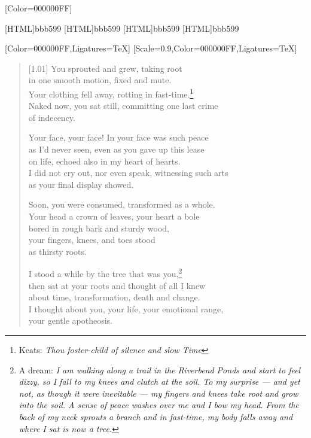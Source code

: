 \renewfontfamily{}[Color=000000FF]

[HTML]{bbb599}
[HTML]{bbb599}
[HTML]{bbb599}
[HTML]{bbb599}
\begin{paracol}{2}
  \begin{leftcolumn}
[Color=000000FF,Ligatures=TeX]
\renewfontfamily{}[Scale=0.9,Color=000000FF,Ligatures=TeX]

\begin{verse}[1.01\textwidth]
You sprouted and grew, taking root\\
in one smooth motion, fixed and mute.\\
Your clothing fell away, rotting in fast-time.\footnote{Keats: \emph{Thou foster-child of silence and slow Time}}\\
Naked now, you sat still, committing one last crime\\
of indecency.

Your face, your face! In your face was such peace\\
as I'd never seen, even as you gave up this lease\\
on life, echoed also in my heart of hearts.\\
I did not cry out, nor even speak, witnessing such arts\\
as your final display showed.

Soon, you were consumed, transformed as a whole.\\
Your head a crown of leaves, your heart a bole\\
bored in rough bark and sturdy wood,\\
your fingers, knees, and toes stood\\
as thirsty roots.

I stood a while by the tree that was you,\footnote{A dream: \emph{I am walking along a trail in the Riverbend Ponds and start to feel dizzy, so I fall to my knees and clutch at the soil. To my surprise --- and yet not, as though it were inevitable --- my fingers and knees take root and grow into the soil. A sense of peace washes over me and I bow my head. From the back of my neck sprouts a branch and in fast-time, my body falls away and where I sat is now a tree.}}\\
then sat at your roots and thought of all I knew\\
about time, transformation, death and change.\\
I thought about you, your life, your emotional range,\\
your gentle apotheosis.
\end{verse}
\newpage
\end{leftcolumn}
\end{paracol}

